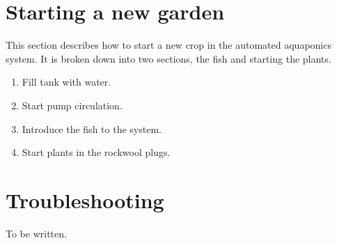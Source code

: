 \documentclass[american,man,12pt]{apa6}
\begin{document}
\section{Starting a new garden}
This section describes how to start a new crop in the automated aquaponics
system. It is broken down into two sections, the fish and starting the plants.

\begin{enumerate}
	\item Fill tank with water.
	\item Start pump circulation.
	\item Introduce the fish to the system.
	\item Start plants in the rockwool plugs.
\end{enumerate}



\section{Troubleshooting}
To be written.


\printbibliography
\end{document}
